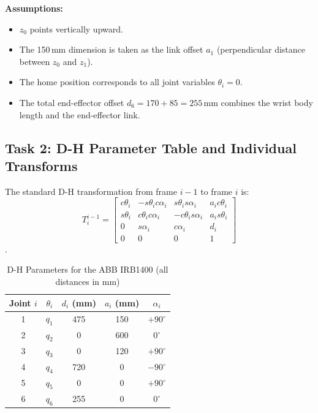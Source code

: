 \documentclass[12pt]{article}
\begin{document}
\textbf{Assumptions:}
\begin{itemize}
    \item $z_0$ points vertically upward.
    \item The 150\,mm dimension is taken as the link offset $a_1$
    (perpendicular distance between $z_0$ and $z_1$).
    \item The home position corresponds to all joint variables
    $\theta_i = 0$.
    \item The total end-effector offset $d_6 = 170 + 85 = 255$\,mm
    combines the wrist body length and the end-effector link.
\end{itemize}

\subsection{Task 2: D-H Parameter Table and Individual Transforms}

The standard D-H transformation from frame $i-1$ to frame $i$ is:
\[
T_i^{i-1} =
\begin{bmatrix}
    c\theta_i & -s\theta_i c\alpha_i &  s\theta_i s\alpha_i & a_i c\theta_i \\
    s\theta_i &  c\theta_i c\alpha_i & -c\theta_i s\alpha_i & a_i s\theta_i \\
    0         &  s\alpha_i           &  c\alpha_i           & d_i           \\
    0         &  0                   &  0                   & 1
\end{bmatrix}
\].

\begin{table}[h]
\centering
\caption{D-H Parameters for the ABB IRB1400 (all distances in mm)}
\renewcommand{\arraystretch}{1.3}
\begin{tabular}{ccccc}
\toprule
Joint $i$ & $\theta_i$ & $d_i$ (mm) & $a_i$ (mm) & $\alpha_i$ \\
\midrule
1 & $q_1$   & 475 & 150 & $+90^\circ$ \\
2 & $q_2$   &   0 & 600 &   $0^\circ$ \\
3 & $q_3$   &   0 & 120 & $+90^\circ$ \\
4 & $q_4$   & 720 &   0 & $-90^\circ$ \\
5 & $q_5$   &   0 &   0 & $+90^\circ$ \\
6 & $q_6$   & 255 &   0 &   $0^\circ$ \\
\bottomrule
\end{tabular}
\end{table}
\end{document}
